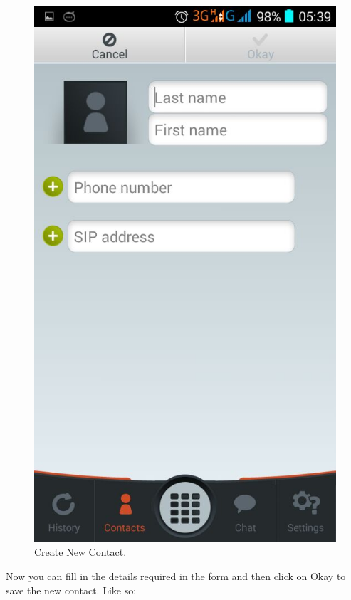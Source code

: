 \documentclass[a4paper]{article}
\begin{document}
\begin{center}
\begin{figure}[H]
\centering
\includegraphics[width=0.7\linewidth]{pictures/Screenshot_2015-08-04-05-39-24.png}
\caption{\label{fig:Screen7}Create New Contact.}
\end{figure}
\end{center}

Now you can fill in the details required in the form and then click on Okay to save the new contact. Like so:
\end{document}
